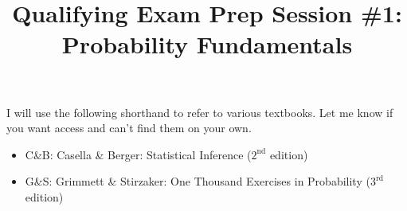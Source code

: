 \documentclass{article}
\title{Qualifying Exam Prep Session \#1: Probability Fundamentals}
\author{}
\date{}
\begin{document}
    \maketitle

    I will use the following shorthand to refer to various textbooks. Let me know if you want access
    and can't find them on your own.
    \begin{itemize}
        \item C\&B: Casella \& Berger: Statistical Inference ($2^{\text{nd}}$ edition)
        \item G\&S: Grimmett \& Stirzaker: One Thousand Exercises in Probability ($3^{\text{rd}}$ edition)
    \end{itemize}

    
    
    
    
\end{document}
